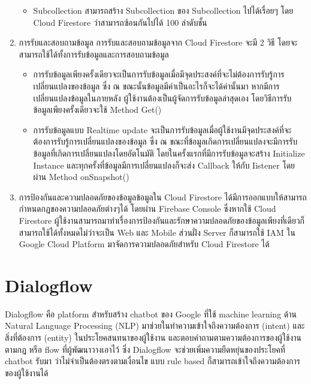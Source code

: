 \begin{enumerate}
\begin{itemize}
		\item Subcollection สามารถสร้าง Subcollection ของ Subcollection ไปได้เรื่อยๆ โดย Cloud Firestore ว่าสามารถซ้อนกันไปได้ 100 ลำดับชั้น
	\end{itemize}
	\item การรับและสอบถามข้อมูล
	การรับและสอบถามข้อมูลจาก Cloud Firestore จะมี 2 วิธี โดยจะสามารถใช้ได้ทั้งการรับข้อมูลและการสอบถามข้อมูล
	\begin{itemize}
		\item การรับข้อมูลเพียงครั้งเดียวจะเป็นการรับข้อมูลเมื่อมีจุดประสงค์ที่จะไม่ต้องการรับรู้การเปลี่ยนแปลงของข้อมูล ซึ่ง ณ ขณะนั้นข้อมูลมีค่าเป็นอะไรก็จะได้ค่านั้นมา หากมีการเปลี่ยนแปลงข้อมูลในภายหลัง ผู้ใช้งานต้องเป็นผู้จัดการรับข้อมูลล่าสุดเอง โดยวิธีการรับข้อมูลเพียงครั้งเดียวจะใช้ Method Get()
		\item การรับข้อมูลแบบ Realtime update จะเป็นการรับข้อมูลเมื่อผู้ใช้งานมีจุดประสงค์ที่จะต้องการรับรู้การเปลี่ยนแปลงของข้อมูล ซึ่ง ณ ขณะที่ข้อมูลเกิดการเปลี่ยนแปลงจะมีการรับข้อมูลที่เกิดการเปลี่ยนแปลงโดยอัตโนมัติ โดยในครั้งแรกที่มีการรับข้อมูลจะสร้าง Initialize Instance และทุกครั้งที่ข้อมูลมีการเปลี่ยนแปลงก็จะส่ง Callback ให้กับ Iistener โดยผ่าน Method onSnapshot()
	\end{itemize}
	\item การป้องกันและความปลอดภัยของข้อมูลข้อมูลใน Cloud Firestore ได้มีการออกแบบให้สามารถกำหนดกฏของความปลอดภัยต่างๆได้ โดยผ่าน Firebase Console  ซึ่งหากใช้ Cloud Firestore ผู้ใช้งานสามารถมาทำเรื่องการป้องกันและรักษาความปลอดภัยของข้อมูลเพียงที่เดียวก็สามารถใช้ได้ทั้งหมดไม่ว่าจะเป็น Web และ Mobile ส่วนฝั่ง Server ก็สามารถใช้ IAM ใน Google Cloud Platform มาจัดการความปลอดภัยสำหรับ Cloud Firestore ได้
\end{enumerate}


\section{Dialogflow}
Dialogflow คือ platform สำหรับสร้าง chatbot ของ Google ที่ใช้ machine learning ด้าน Natural Language Processing (NLP) มาช่วยในทำความเข้าใจถึงความต้องการ (intent) และสิ่งที่ต้องการ (entity) ในประโยคสนทนาของผู้ใช้งาน และตอบคำถามตามความต้องการของผู้ใช้งาน ตามกฎ หรือ flow ที่ผู้พัฒนาวางเอาไว้ ซึ่ง Dialogflow จะช่วยเพิ่มความยืดหยุ่นของประโยคที่ chatbot รับมา ว่าไม่จำเป็นต้องตรงตามเงื่อนไข แบบ rule based ก็สามารถเข้าใจถึงความต้องการของผู้ใช้งานได้

